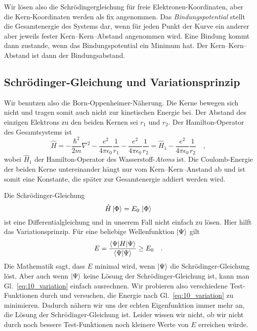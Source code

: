 Wir lösen also die Schrödingergleichung für freie Elektronen-Koordinaten, aber die Kern-Koordinaten werden als fix angenommen. Das \emph{Bindungspotential} stellt die Gesamtenergie des Systems dar, wenn für jeden Punkt der Kurve ein anderer aber jeweils fester Kern--Kern--Abstand angenommen wird. Eine Bindung kommt dann zustande, wenn das Bindungspotential ein Minimum hat. Der Kern--Kern--Abstand ist dann der Bindungsabstand.


\subsection{Schrödinger-Gleichung und Variationsprinzip}

Wir benutzen also die Born-Oppenheimer-Näherung. Die Kerne bewegen sich nicht und tragen somit auch nicht zur kinetischen Energie bei. Der Abstand des einzigen Elektrons zu den beiden Kernen sei $r_1$ und $r_2$. Der Hamilton-Operator des Gesamtsystems ist
\begin{equation}
\hat{H} =  - \frac{\hbar^2}{2 m} \nabla^2 - \frac{e^2}{4 \pi \epsilon_0} \frac{1}{r_{1}} - \frac{e^2}{4 \pi \epsilon_0} \frac{1}{r_{2}}
= \hat{H}_1  - \frac{e^2}{4 \pi \epsilon_0} \frac{1}{r_{2}} \quad ,
\end{equation} 
wobei $\hat{H}_1 $ der Hamilton-Operator des Wasserstoff-\emph{Atoms} ist. Die Coulomb-Energie der beiden Kerne untereinander hängt nur vom Kern--Kern--Anstand ab und ist somit eine Konstante, die später zur Gesamtenergie addiert werden wird.


Die Schrödinger-Gleichung
\begin{equation}
 \hat{H} \ket{\Phi} = E_0 \, \ket{\Phi} 
\end{equation}
ist eine Differentialgleichung und in unserem Fall nicht einfach zu lösen. Hier hilft das Variationsprinzip. Für eine beliebige Wellenfunktion  $\ket{\Psi}$ gilt
\begin{equation}
 E = \frac{\braket{\Psi | H | \Psi}} {\braket{\Psi | \Psi}} \ge E_0 \quad .
 \label{eq:10_variation}
\end{equation}
Die Mathematik sagt, dass $E$ minimal wird, wenn  $\ket{\Psi}$ die Schrödinger-Gleichung löst. Aber auch wenn $\ket{\Psi}$ keine Lösung der Schrödinger-Gleichung  ist, kann man Gl.~\ref{eq:10_variation} einfach ausrechnen. Wir probieren  also verschiedene Test-Funktionen durch und versuchen, die Energie nach Gl.~\ref{eq:10_variation} zu minimieren. Dadurch nähern wir uns der echten Eigenfunktion immer mehr an, die Lösung der Schrödinger-Gleichung ist. Leider wissen wir nicht, ob wir  nicht durch noch bessere Test-Funktionen noch kleinere Werte von $E$ erreichen würde.


